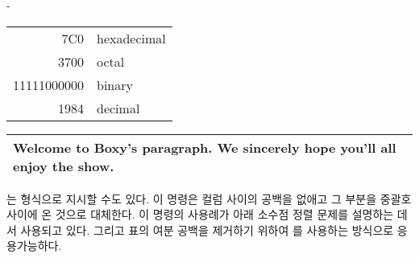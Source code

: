 \begin{adjustwidth}{0pt}{-\margheadwidth}


\begin{example}
\begin{tabular}{|r|l|}
\hline
7C0 & hexadecimal \\
3700 & octal \\ \cline{2-2}
11111000000 & binary \\
\hline \hline
1984 & decimal \\
\hline
\end{tabular}
\end{example}

\vspace{-.5\onelineskip}

\begin{example}
\begin{tabular}{|p{4.7cm}|}
\hline
Welcome to Boxy's paragraph.
We sincerely hope you'll
all enjoy the show.\\
\hline
\end{tabular}
\end{example}

는  형식으로 지시할 수도 있다.
이 명령은 컬럼 사이의 공백을 없애고 그 부분을 중괄호 사이에 온 것으로 대체한다.
이 명령의 사용례가 아래 소수점 정렬 문제를 설명하는 데서 사용되고 있다.
그리고 표의 여분 공백을 제거하기 위하여 를 사용하는 방식으로 응용가능하다.


\end{adjustwidth}
